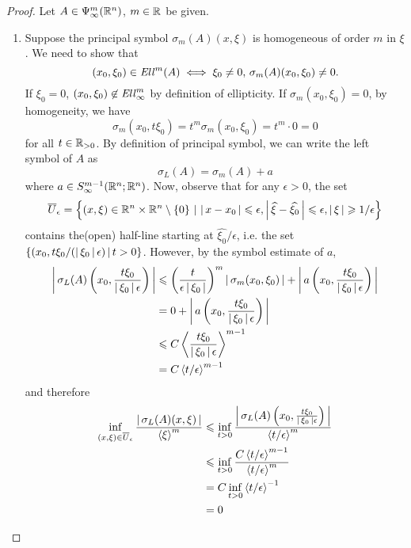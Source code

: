 \documentclass[12pt]{article}
\begin{document}
\begin{proof}
    Let $A \in \Psi^m_\infty(\R^n)$, $m \in \R$ be given. 
    \begin{enumerate}
        \item Suppose the principal symbol $\sigma_m(A)(x, \xi)$ is homogeneous of order $m$ in $\xi$. We need to show that 
        \[
        (x_0, \xi_0) \in \Ell^m(A) \iff \xi_0 \neq 0, \, \sigma_m(A)(x_0, \xi_0) \neq 0. 
        \]
        If $\xi_0 = 0$, $(x_0, \xi_0) \not \in \Ell^m_\infty$ by definition of ellipticity. If $\sigma_m(x_0, \xi_0) = 0$, by homogeneity, we have 
        \[
        \sigma_m(x_0, t \xi_0) = t^m \sigma_m(x_0, \xi_0) = t^m \cdot 0 = 0
        \]
        for all $t \in \R_{> 0}$. By definition of principal symbol, we can write the left symbol of $A$ as 
        \[
        \sigma_L(A) = \sigma_m(A) + a
        \]
        where $a \in S^{m -1}_\infty(\R^n; \R^n)$. Now, observe that for any $\epsilon > 0$, the set 
         \[
        \overline{U}_\epsilon = \set{(x, \xi) \in \R^n \times \R^n \setminus \set{0} \wh \abs{x - x_0} \leq \epsilon, \abs{\widehat{\xi} - \widehat{\xi_0}} \leq \epsilon, \abs{\xi} \geq 1/\epsilon}
        \]
        contains the(open) half-line starting at $\widehat{\xi_0} / \epsilon$, i.e. the set $\set{(x_0, t \xi_0/(\abs{\xi_0}\epsilon)\wh t > 0}$. However, by the symbol estimate of $a$, 
        \begin{align*}
        \abs{\sigma_L(A)\brac{x_0, \frac{t \xi_0}{\abs{\xi_0} \epsilon}}}
        & \leq \brac{\frac{t}{\epsilon \abs{\xi_0}}}^m \abs{\sigma_m(x_0, \xi_0)} + \abs{a\brac{x_0, \frac{t \xi_0}{\abs{\xi_0} \epsilon}}} \\
        & = 0 + \abs{a\brac{x_0, \frac{t \xi_0}{\abs{\xi_0} \epsilon}}} \\
        & \leq C \sym[\frac{t \xi_0}{\abs{\xi_0} \epsilon}]^{m - 1} \\
        & = C\sym[t/\epsilon]^{m - 1}
        \end{align*}
        and therefore 
        \begin{align*}
        \inf_{(x, \xi) \in \overline{U}_\epsilon} \frac{\abs{\sigma_L(A)(x, \xi)}}{\sym[\xi]^m} 
        & \leq \inf_{t > 0}  \frac{\abs{\sigma_L(A)\brac{x_0, \frac{t \xi_0}{\abs{\xi_0} \epsilon}}} }{\sym[t /\epsilon]^m} \\
        & \leq \inf_{t > 0}  \frac{C\sym[t/ \epsilon]^{m - 1} }{\sym[t /\epsilon]^m} \\
        & = C\inf_{t > 0} \sym[t/\epsilon]^{-1}\\
        & = 0

\end{align*}
\end{enumerate}
\end{proof}
\end{document}
